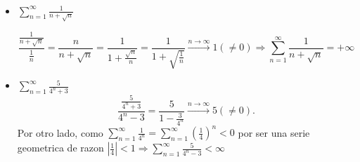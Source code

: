 \begin{example}
	~\begin{itemize}
		\item \(\sum_{n =1}^{\infty} \frac{1}{n + \sqrt{n } }\)
		      
		      \[
			      \frac{\frac{1 }{n + \sqrt{n } }}{\frac{1}{n }} = \frac{n }{n + \sqrt{n } } = \frac{1}{1 + \frac{\sqrt{n } }{n }} = \frac{1}{1 + \sqrt{\frac{1}{n }} } \overset{n\rightarrow \infty}{\longrightarrow} 1 (\neq 0) \Rightarrow \sum_{n =1}^{\infty} \frac{1}{n+\sqrt{n} } = + \infty
		      \]
		\item \(\sum_{n =1}^{\infty} \frac{5}{4^{n} + 3 }\)
		      \[
			      \frac{\frac{5}{4^{n} + 3 }}{4^{n} -3 } = \frac{5}{1 - \frac{3}{4^{n} }} \overset{n\rightarrow \infty}{\longrightarrow} 5 (\neq 0).
		      \]
		      Por otro lado, como \(\sum_{n =1}^{\infty} \frac{1}{4^{n} } = \sum_{n =1}^{\infty} \left (\frac{1}{4} \right)^{n} < 0\) por ser una serie geometrica de razon \( \left\vert \frac{1}{4} \right\vert  < 1 \Rightarrow \sum_{n =1}^{\infty} \frac{5}{4^{n} - 3 } < \infty\)
	\end{itemize}
\end{example}
